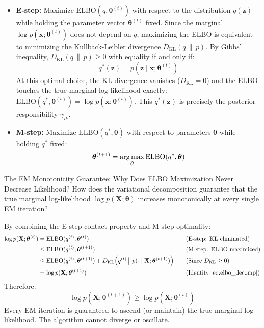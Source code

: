 \begin{itemize}
    \item \textbf{E-step:} Maximize $\text{ELBO}(q, \boldsymbol{\theta}^{(t)})$ with respect to the distribution $q(\mathbf{z})$ while holding the parameter vector $\boldsymbol{\theta}^{(t)}$ fixed. Since the marginal $\log p(\mathbf{x}; \boldsymbol{\theta}^{(t)})$ does not depend on $q$, maximizing the ELBO is equivalent to minimizing the Kullback-Leibler divergence $D_{\text{KL}}(q \,\|\, p)$. By Gibbs' inequality, $D_{\text{KL}}(q \,\|\, p) \ge 0$ with equality if and only if:
    \begin{equation}
    q^*(\mathbf{z}) = p(\mathbf{z} \mid \mathbf{x}; \boldsymbol{\theta}^{(t)})
    \end{equation}
    At this optimal choice, the KL divergence vanishes ($D_{\text{KL}} = 0$) and the ELBO touches the true marginal log-likelihood exactly: $\text{ELBO}(q^*, \boldsymbol{\theta}^{(t)}) = \log p(\mathbf{x}; \boldsymbol{\theta}^{(t)})$. This $q^*(\mathbf{z})$ is precisely the posterior responsibility $\gamma_{ik}$.
    \item \textbf{M-step:} Maximize $\text{ELBO}(q^*, \boldsymbol{\theta})$ with respect to parameters $\boldsymbol{\theta}$ while holding $q^*$ fixed:
    \begin{equation}
    \boldsymbol{\theta}^{(t+1)} = \operatorname*{arg\,max}_{\boldsymbol{\theta}} \text{ELBO}(q^*, \boldsymbol{\theta})
    \end{equation}
\end{itemize}

\begin{ponderbox}{The EM Monotonicity Guarantee: Why Does ELBO Maximization Never Decrease Likelihood?}
How does the variational decomposition guarantee that the true marginal log-likelihood $\log p(\mathbf{X}; \boldsymbol{\theta})$ increases monotonically at every single EM iteration?

\tcblower
By combining the E-step contact property and M-step optimality:
\begin{align*}
\log p(\mathbf{X}; \boldsymbol{\theta}^{(t)}) &= \text{ELBO}(q^{(t)}, \boldsymbol{\theta}^{(t)}) \quad &&\text{(E-step: KL eliminated)} \\
&\le \text{ELBO}(q^{(t)}, \boldsymbol{\theta}^{(t+1)}) \quad &&\text{(M-step: ELBO maximized)} \\
&\le \text{ELBO}(q^{(t)}, \boldsymbol{\theta}^{(t+1)}) + D_{\text{KL}}\!\left(q^{(t)} \,\big\|\, p(\cdot \mid \mathbf{X}; \boldsymbol{\theta}^{(t+1)})\right) \quad &&\text{(Since } D_{\text{KL}} \ge 0\text{)} \\
&= \log p(\mathbf{X}; \boldsymbol{\theta}^{(t+1)}) \quad &&\text{(Identity~\eqref{eq:elbo_decomp})}
\end{align*}
Therefore:
\begin{equation*}
\log p(\mathbf{X}; \boldsymbol{\theta}^{(t+1)}) \ge \log p(\mathbf{X}; \boldsymbol{\theta}^{(t)})
\end{equation*}
Every EM iteration is guaranteed to ascend (or maintain) the true marginal log-likelihood. The algorithm cannot diverge or oscillate.
\end{ponderbox}

